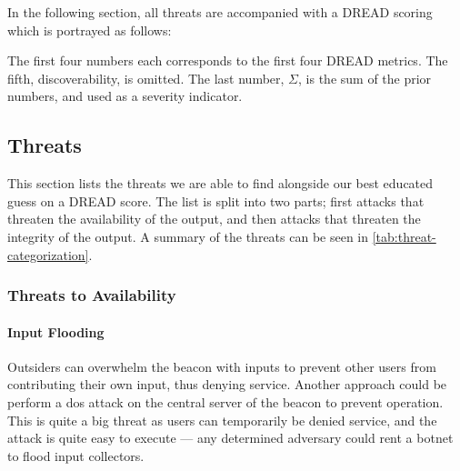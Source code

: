 In the following section, all threats are accompanied with a DREAD scoring which is portrayed as follows:
\vspace{\dimexpr-1\parsep-1\parskip\relax}%
\begin{center}
\end{center}
\vspace{\dimexpr-1\parsep-1\parskip\relax}%
The first four numbers each corresponds to the first four DREAD metrics.
The fifth, discoverability, is omitted.
The last number, $\Sigma$, is the sum of the prior numbers, and used as a severity indicator.

\subsection{Threats}
This section lists the threats we are able to find alongside our best educated guess on a DREAD score.
The list is split into two parts; first attacks that threaten the availability of the output, and then attacks that threaten the integrity of the output.
A summary of the threats can be seen in \vref{tab:threat-categorization}.

\subsubsection{Threats to Availability}

\newcommand{\parathreat}[1]{\paragraph{#1}\hspace{-1ex}}

\parathreat{Input Flooding}
Outsiders can overwhelm the beacon with inputs to prevent other users from contributing their own input, thus denying service.
Another approach could be perform a \gls{dos} attack on the central server of the beacon to prevent operation.
This is quite a big threat as users can temporarily be denied service, and the attack is quite easy to execute --- any determined adversary could rent a botnet to flood input collectors.

